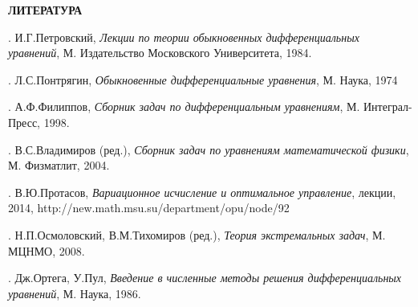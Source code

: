 \documentclass[12pt,a4paper]{article}
\begin{document}
\begin{center}
\textbf{ЛИТЕРАТУРА}
\end{center}
\bigskip

. И.Г.Петровский, {\em Лекции по теории обыкновенных дифференциальных уравнений},
М. Издательство Московского Университета, 1984.
\smallskip

. Л.С.Понтрягин, {\em Обыкновенные дифференциальные уравнения}, М. Наука, 1974
\smallskip

. А.Ф.Филиппов, {\em Сборник задач по дифференциальным уравнениям},  М. Интеграл-Пресс, 1998.
\smallskip

. В.С.Владимиров (ред.),  {\em Сборник задач по уравнениям математической физики}, М. Физматлит, 2004.
\smallskip

. В.Ю.Протасов, {\em Вариационное исчисление и оптимальное управление}, лекции, 2014,
http://new.math.msu.su/department/opu/node/92
\smallskip

. Н.П.Осмоловский, В.М.Тихомиров (ред.), {\it
Теория экстремальных задач}, М. МЦНМО, 2008.
\smallskip

. Дж.Ортега, У.Пул, {\em Введение в численные методы решения дифференциальных уравнений}, М. Наука, 1986.
\smallskip
\end{document}
